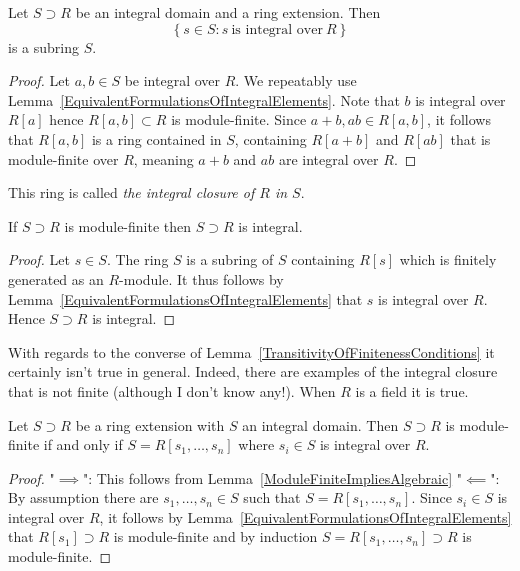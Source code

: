 \begin{proposition}\label{IntegralElementsIsSubring}
    Let $S\supset R$ be an integral domain and a ring extension. Then 
    $$\left\{ s\in S : s \ \text{is integral over} \ R\right\}$$
    is a subring $S$.
\end{proposition}
\begin{proof}
    Let $a,b\in S$ be integral over $R$. We repeatably use Lemma~\ref{EquivalentFormulationsOfIntegralElements}. Note that $b$ is integral over $R[a]$ hence $R[a,b]\subset R$ is module-finite. Since $a + b, ab\in R[a,b]$, it follows that $R[a,b]$ is a ring contained in $S$, containing $R[a+b]$ and $R[ab]$ that is module-finite over $R$, meaning $a+b$ and $ab$ are integral over $R$. 
\end{proof}
\begin{remark}
    This ring is called \emph{the integral closure of $R$ in $S$}. 
\end{remark}
\begin{lemma}\label{ModuleFiniteImpliesAlgebraic}
    If $S\supset R$ is module-finite then $S\supset R$ is integral. 
\end{lemma}
\begin{proof}
    Let $s\in S$. The ring $S$ is a subring of $S$ containing $R[s]$ which is finitely generated as an $R$-module. It thus follows by Lemma~\ref{EquivalentFormulationsOfIntegralElements} that $s$ is integral over $R$. Hence $S\supset R$ is integral.
\end{proof}
\begin{example}
    With regards to the converse of Lemma~\ref{TransitivityOfFinitenessConditions} it certainly isn't true in general. Indeed, there are examples of the integral closure that is not finite (although I don't know any!). When $R$ is a field it is true.   
\end{example}
\begin{lemma}\label{ForRingFiniteExtensionsModuleFiniteIsTheSameAsAlgebraic}
    Let $S\supset R$ be a ring extension with $S$ an integral domain. Then $S\supset R$ is module-finite if and only if $S=R[s_1,\dots,s_n]$ where $s_i\in S$ is integral over $R$. 
\end{lemma}
\begin{proof}
    "$\implies$": This follows from Lemma~\ref{ModuleFiniteImpliesAlgebraic}
    "$\impliedby$": By assumption there are $s_1,\dots,s_n\in S$ such that $S = R[s_1,\dots,s_n]$. Since $s_i\in S$ is integral over $R$, it follows by Lemma~\ref{EquivalentFormulationsOfIntegralElements} that $R[s_1] \supset R$ is module-finite and by induction $S=R[s_1,\dots,s_n]\supset R$ is module-finite. 
\end{proof}
